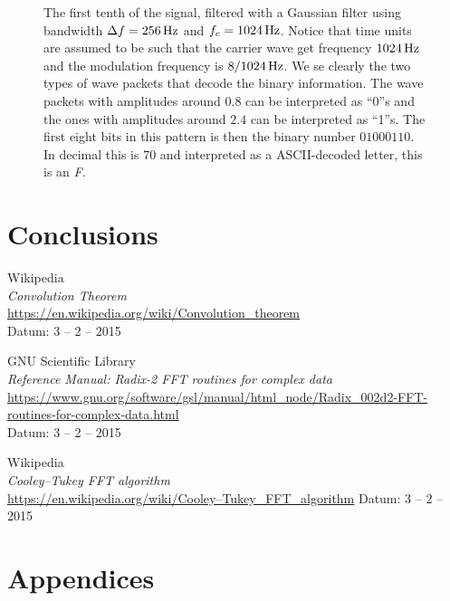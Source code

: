 \documentclass[12pt,a4paper]{article}
\begin{document}
\begin{figure}
  \begin{small}
  \centering
  
  \caption{The first tenth of the signal, filtered with a Gaussian
    filter using bandwidth
    $\Delta f = \unit[256]{Hz}$ and $f_c = \unit[1024]{Hz}$.
    Notice that time units are assumed to be such that the carrier wave
    get frequency $\unit[1024]{Hz}$ and the modulation frequency
    is $\unit[8/1024]{Hz}$.
    We se clearly the two types of
    wave packets that decode the binary information.
    The wave packets with amplitudes
    around $0.8$ can be interpreted as ``0''s
    and the ones with amplitudes around $2.4$ can be interpreted as ``1''s.
    The first eight bits in this pattern is then the binary number $01000110$.
    In decimal this is $70$ and interpreted as a
    ASCII-decoded letter, this is an \textit{F}.
  }
  \label{fig:filtered_with_bandwidth_256}
  \end{small}
\end{figure}



\section{Conclusions}


\clearpage
\begin{thebibliography}{99}

  Wikipedia\\
  \emph{Convolution Theorem}\\
  \url{https://en.wikipedia.org/wiki/Convolution_theorem}\\
  Datum: 3 -- 2 -- 2015

  GNU Scientific Library\\
  \emph{Reference Manual: Radix-2 FFT routines for complex data}\\
  \url{https://www.gnu.org/software/gsl/manual/html_node/Radix_002d2-FFT-routines-for-complex-data.html}\\
  Datum: 3 -- 2 -- 2015

  Wikipedia\\
  \emph{Cooley–Tukey FFT algorithm}\\
  \url{https://en.wikipedia.org/wiki/Cooley–Tukey_FFT_algorithm}
  Datum: 3 -- 2 -- 2015


\end{thebibliography}

\appendix
\section{Appendices}
\end{document}
